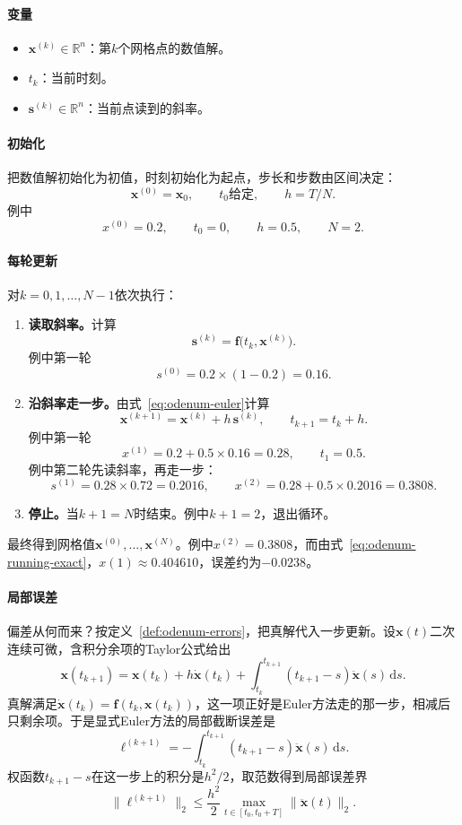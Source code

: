 \paragraph{变量}
\begin{itemize}
 \item $\bm{x}^{(k)}\in\mathbb{R}^{n}$：第$k$个网格点的数值解。
 \item $t_k$：当前时刻。
 \item $\bm{s}^{(k)}\in\mathbb{R}^{n}$：当前点读到的斜率。
\end{itemize}

\paragraph{初始化}
把数值解初始化为初值，时刻初始化为起点，步长和步数由区间决定：
\[
 \bm{x}^{(0)}=\bm{x}_0,\qquad t_0\text{给定},\qquad h=T/N.
\]
例中
\[
 x^{(0)}=0.2,\qquad t_0=0,\qquad h=0.5,\qquad N=2.
\]

\paragraph{每轮更新}
对$k=0,1,\ldots,N-1$依次执行：
\begin{enumerate}
 \item \textbf{读取斜率。}计算
 \[
  \bm{s}^{(k)}=\bm{f}\bigl(t_k,\bm{x}^{(k)}\bigr).
 \]
 例中第一轮
 \[
  s^{(0)}=0.2\times(1-0.2)=0.16.
 \]
 \item \textbf{沿斜率走一步。}由式~\eqref{eq:odenum-euler}计算
 \[
  \bm{x}^{(k+1)}=\bm{x}^{(k)}+h\,\bm{s}^{(k)},\qquad t_{k+1}=t_k+h.
 \]
 例中第一轮
 \[
  x^{(1)}=0.2+0.5\times0.16=0.28,\qquad t_1=0.5.
 \]
 例中第二轮先读斜率，再走一步：
 \[
  s^{(1)}=0.28\times0.72=0.2016,\qquad x^{(2)}=0.28+0.5\times0.2016=0.3808.
 \]
 \item \textbf{停止。}当$k+1=N$时结束。例中$k+1=2$，退出循环。
\end{enumerate}
最终得到网格值$\bm{x}^{(0)},\ldots,\bm{x}^{(N)}$。例中$x^{(2)}=0.3808$，而由式~\eqref{eq:odenum-running-exact}，$x(1)\approx0.404610$，误差约为$-0.0238$。

\paragraph{局部误差}
偏差从何而来？按定义~\ref{def:odenum-errors}，把真解代入一步更新。设$\bm{x}(t)$二次连续可微，含积分余项的Taylor公式给出
\[
 \bm{x}(t_{k+1})=\bm{x}(t_k)+h\dot{\bm{x}}(t_k)+\int_{t_k}^{t_{k+1}}(t_{k+1}-s)\ddot{\bm{x}}(s)\,\mathrm{d}s.
\]
真解满足$\dot{\bm{x}}(t_k)=\bm{f}(t_k,\bm{x}(t_k))$，这一项正好是Euler方法走的那一步，相减后只剩余项。于是显式Euler方法的局部截断误差是
\begin{equation}
 \bm{\ell}^{(k+1)}=-\int_{t_k}^{t_{k+1}}(t_{k+1}-s)\ddot{\bm{x}}(s)\,\mathrm{d}s.
 \label{eq:odenum-euler-local}
\end{equation}
权函数$t_{k+1}-s$在这一步上的积分是$h^2/2$，取范数得到局部误差界
\begin{equation}
 \bigl\lVert\bm{\ell}^{(k+1)}\bigr\rVert_2\leq\frac{h^2}{2}\max_{t\in[t_0,t_0+T]}\bigl\lVert\ddot{\bm{x}}(t)\bigr\rVert_2.
 \label{eq:odenum-euler-local-bound}
\end{equation}

